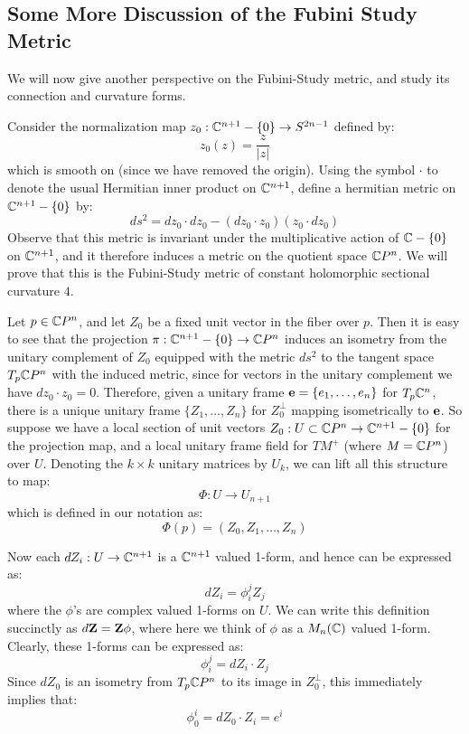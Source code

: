 \subsection{Some More Discussion of the Fubini Study Metric}

We will now give another perspective on the Fubini-Study metric, and study its connection and curvature forms.

Consider the normalization map $z_0 : \mathbb{C}^{n+1} - \{0\} \rightarrow S^{2n-1}$ defined by:
%
$$ z_0(z) = \frac{z}{|z|} $$
%
which is smooth on (since we have removed the origin).  Using the symbol $\cdot$ to denote the usual Hermitian inner product on $\mathbb{C}^{n+1}$, define a hermitian metric on $\mathbb{C}^{n+1} - \{0\}$ by:
%
$$ds^2 = d z_0 \cdot d z_0 - ( d z_0 \cdot z_0 )( z_0 \cdot d z_0 ) $$
%
Observe that this metric is invariant under the multiplicative action of $\mathbb{C} - \{0\}$ on $\mathbb{C}^{n+1}$, and it therefore induces a metric on the quotient space $\mathbb{C}P^{n}$.  We will prove that this is the Fubini-Study metric of constant holomorphic sectional curvature $4$.

Let $p \in \mathbb{C}P^{n}$, and let $Z_0$ be a fixed unit vector in the fiber over $p$.  Then it is easy to see that the projection $\pi : \mathbb{C}^{n+1} - \{0\} \rightarrow \mathbb{C}P^{n}$ induces an isometry from the unitary complement of $Z_0$ equipped with the metric $ds^2$ to the tangent space $T_p \mathbb{C}P^{n}$ with the induced metric, since for vectors in the unitary complement we have $ d z_0 \cdot z_0 = 0 $.  Therefore, given a unitary frame $\mathbf{e} = \{ e_1, \ldots, e_n \}$ for $T_p \mathbb{C}^n$, there is a unique unitary frame $ \{ Z_1, \ldots, Z_n \} $ for $Z_0^{\perp}$ mapping isometrically to $\mathbf{e}$.  So suppose we have a local section of unit vectors $Z_0 : U \subset \mathbb{C}P^{n} \rightarrow  \mathbb{C}^{n+1} - \{0\}$ for the projection map, and a local unitary frame field for $TM^{+}$ (where $M = \mathbb{C}P^{n}$) over $U$.  Denoting the $k \times k$ unitary matrices by $U_k$, we can lift all this structure to map:
%
$$ \Phi : U \rightarrow U_{n+1} $$
% 
which is defined in our notation as:
%
$$ \Phi(p) = (Z_0, Z_1, \ldots, Z_n) $$

Now each $d Z_i : U \rightarrow \mathbb{C}^{n+1}$ is a $\mathbb{C}^{n+1}$ valued 1-form, and hence can be expressed as:
%
$$ d Z_i = \phi^j_i Z_j $$
%
where the $\phi$'s are complex valued 1-forms on $U$.  We can write this definition succinctly as $ d \mathbf{Z} = \mathbf{Z} \phi$, where here we think of $\phi$ as a $M_{n}( \mathbb{C} )$ valued 1-form.  Clearly, these 1-forms can be expressed as:
%
$$ \phi^j_i = d Z_i \cdot Z_j $$
%
Since $d Z_0$ is an isometry from $T_p \mathbb{C}P^n$ to its image in $Z_0^{\perp}$, this immediately implies that:
%
$$ \phi^i_0 = d Z_0 \cdot Z_i = e^i $$
%


